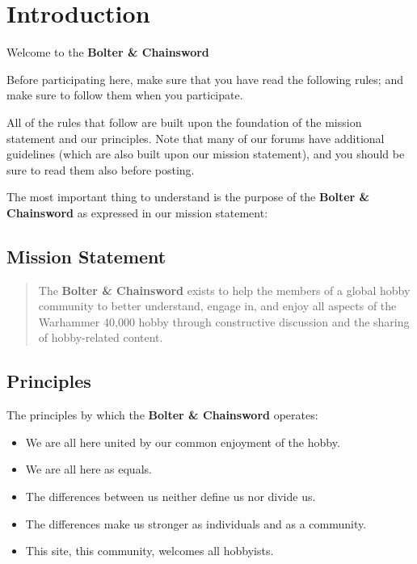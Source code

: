 \documentclass[12pt]{article}
\newcommand{\bnc}{{\textbf{Bolter \& Chainsword}}}%
\begin{document}
\tableofcontents
\listoffigures
\listoftables
\clearpage

\section{Introduction}

Welcome to the {\bnc}
\medskip

Before participating here, make sure that you have read the following 
rules; and make sure to follow them when you participate.
\medskip

All of the rules that follow are built upon the foundation of the 
mission statement and our principles. Note that many of our forums have 
additional guidelines (which are also built upon our mission 
statement), and you should be sure to read them also before posting.
\medskip

The most important thing to understand is the purpose of the {\bnc}
 as expressed in our mission statement:
\medskip

\subsection{Mission Statement}
\begin{quote}
The {\bnc} exists to help the members of a global hobby 
community to better understand, engage in, and enjoy all aspects of the 
Warhammer 40,000 hobby through constructive discussion and the sharing 
of hobby-related content.
\end{quote}


\subsection{Principles}

The principles by which the {\bnc} operates:

\begin{table}[H]
\begin{itemize}
\item We are all here united by our common enjoyment of the hobby.
\item We are all here as equals.
\item The differences between us neither define us nor divide us.
\item The differences make us stronger as individuals and as a 
community.
\item This site, this community, welcomes all hobbyists.
\end{itemize}
	\caption{The {\bnc} Principles}
\end{table}
\end{document}
